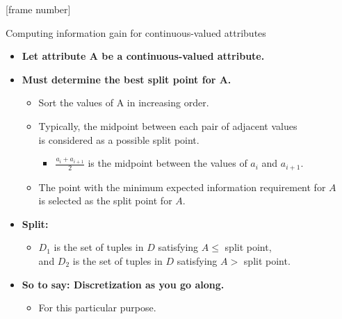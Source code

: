 \documentclass[aspectratio=169,t,table]{beamer}
\begin{document}
  {
    [frame number]
    \begin{frame}{Computing information gain for continuous-valued attributes}
      \begin{itemize}
        \item \textbf{Let attribute A be a continuous-valued attribute.}
        \item \textbf{Must determine the best split point for A.}
        \begin{itemize}
          \item Sort the values of A in increasing order.
          \item Typically, the midpoint between each pair of adjacent values \\ is considered as a possible split point.
          \begin{itemize}
            \item $\frac{a_i+a_{i+1}}{2}$ is the midpoint between the values of $a_i$ and $a_{i+1}$.
          \end{itemize}
          \item The point with the minimum expected information requirement for $A$ \\ is selected as the split point for $A$.
        \end{itemize}
        \item \textbf{Split:}
        \begin{itemize}
          \item $D_1$ is the set of tuples in $D$ satisfying $A \leq$ split point,\\
                and $D_2$ is the set of tuples in $D$ satisfying $A >$ split point.
        \end{itemize}
        \item \textbf{So to say: Discretization as you go along.}
        \begin{itemize}
          \item For this particular purpose.
        \end{itemize}
      \end{itemize}
    \end{frame}
  }
\end{document}
